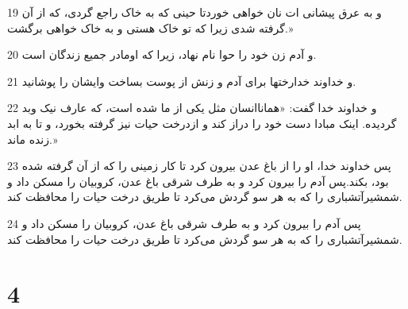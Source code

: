 \par 19 و به عرق پیشانی ات نان خواهی خوردتا حینی که به خاک راجع گردی، که از آن گرفته شدی زیرا که تو خاک هستی و به خاک خواهی برگشت.»
\par 20 و آدم زن خود را حوا نام نهاد، زیرا که اومادر جمیع زندگان است.
\par 21 و خداوند خدارختها برای آدم و زنش از پوست بساخت وایشان را پوشانید.
\par 22 و خداوند خدا گفت: «هماناانسان مثل یکی از ما شده است، که عارف نیک وبد گردیده. اینک مبادا دست خود را دراز کند و ازدرخت حیات نیز گرفته بخورد، و تا به ابد زنده ماند.»
\par 23 پس خداوند خدا، او را از باغ عدن بیرون کرد تا کار زمینی را که از آن گرفته شده بود، بکند.پس آدم را بیرون کرد و به طرف شرقی باغ عدن، کروبیان را مسکن داد و شمشیرآتشباری را که به هر سو گردش می‌کرد تا طریق درخت حیات را محافظت کند.
\par 24 پس آدم را بیرون کرد و به طرف شرقی باغ عدن، کروبیان را مسکن داد و شمشیرآتشباری را که به هر سو گردش می‌کرد تا طریق درخت حیات را محافظت کند.
 
\chapter{4}

